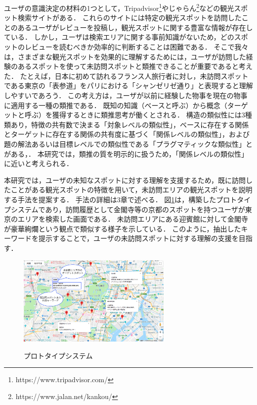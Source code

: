 \documentclass[submit]{ipsj}
\begin{document}
ユーザの意識決定の材料の1つとして，Tripadvisor\footnote{https://www.tripadvisor.com/}やじゃらん\footnote{https://www.jalan.net/kankou/}などの観光スポット検索サイトがある．
これらのサイトには特定の観光スポットを訪問したことのあるユーザがレビューを投稿し，観光スポットに関する豊富な情報が存在している．
しかし，ユーザは検索エリアに関する事前知識がないため，どのスポットのレビューを読むべきか効率的に判断することは困難である．
そこで我々は，さまざまな観光スポットを効果的に理解するためには，ユーザが訪問した経験のあるスポットを使って未訪問スポットと類推できることが重要であると考えた．
たとえば，日本に初めて訪れるフランス人旅行者に対し，未訪問スポットである東京の「表参道」をパリにおける「シャンゼリゼ通り」と表現すると理解しやすいであろう．
この考え方は，ユーザが以前に経験した物事を現在の物事に適用する一種の類推である．
既知の知識（ベースと呼ぶ）から概念（ターゲットと呼ぶ）を獲得するときに類推思考が働くとされる\cite{Gentner}．
構造の類似性には3種類あり，特徴の共有数で決まる「対象レベルの類似性」，ベースに存在する関係とターゲットに存在する関係の共有度に基づく「関係レベルの類似性」，および題の解法あるいは目標レベルでの類似性である「プラグマティックな類似性」とがある\cite{Gentner}，\cite{Holyoak}．
本研究では，類推の質を明示的に扱うため，「関係レベルの類似性」に近いと考えられる．

本研究では，ユーザの未知なスポットに対する理解を支援するため，既に訪問したことがある観光スポットの特徴を用いて，未訪問エリアの観光スポットを説明する手法を提案する．
手法の詳細は3章で述べる．
図\ref{fig:Photo_Map}は，構築したプロトタイプシステムであり，訪問履歴として金閣寺等の京都のスポットを持つユーザが東京のエリアを検索した画面である．
未訪問エリアにある迎賓館に対して金閣寺が豪華絢爛という観点で類似する様子を示している．
このように，抽出したキーワードを提示することで，ユーザの未訪問スポットに対する理解の支援を目指す．

\begin{figure}[t]
  \begin{center}
    \includegraphics[clip,width=7.5cm]{picture/Photo_Map2_jap.png}
    \caption{プロトタイプシステム}
    \label{fig:Photo_Map}
   \end{center}
\end{figure}
\end{document}
